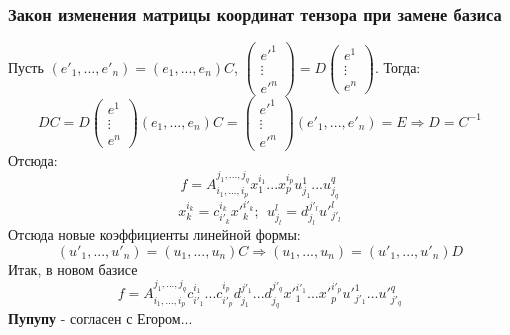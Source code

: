 \subsubsection*{Закон изменения матрицы координат тензора при замене базиса}
Пусть $(e'_1,...,e'_n) = (e_1,...,e_n)C$, $\begin{pmatrix} e'^1 \\ \vdots \\ e'^n \end{pmatrix} = D\begin{pmatrix} e^1 \\ \vdots \\ e^n \end{pmatrix}$. Тогда:
\[DC = D\begin{pmatrix} e^1 \\ \vdots \\ e^n \end{pmatrix}(e_1,...,e_n)C = \begin{pmatrix} e'^1 \\ \vdots \\ e'^n \end{pmatrix}(e'_1,...,e'_n) = E \Rightarrow D = C^{-1}\]
Отсюда:
\[f = A_{i_1,...,i_p}^{j_1,...,j_q}x_1^{i_1}...x_p^{i_p}u_{j_1}^1...u_{j_q}^q\]
\[x_k^{i_k} = c_{i'_k}^{i_k}{x'}^{i'_k}_k; \ \ u_{j_l}^{l} = d_{j_l}^{j'_l}u'^l_{j'_l}\]
Отсюда новые коэффициенты линейной формы:
\[(u'_1,...,u'_n) = (u_1,...,u_n)C \Longrightarrow (u_1,...,u_n) = (u'_1,...,u'_n)D\]
Итак, в новом базисе
\[f = A_{i_1,...,i_p}^{j_1,...,j_q} c_{i'_1}^{i_1}...c_{i'_p}^{i_p}d_{j_1}^{j'_1}...d_{j_q}^{j'_q}{x'}^{i'_1}_1...{x'}^{i'_p}_p {u'}^{1}_{j'_1}...{u'}^{q}_{j'_q}\]
\textbf{Пупупу} - согласен с Егором...
